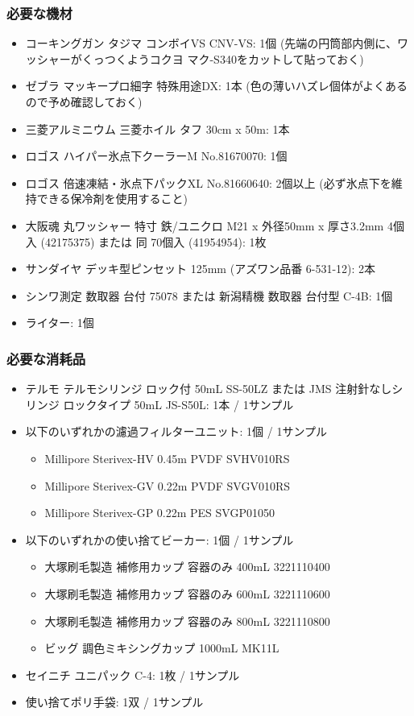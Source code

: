 \documentclass[titlepage,10pt,a4paper]{jsbook}
\begin{document}
\subsubsection{必要な機材}
\begin{itemize}
\item コーキングガン タジマ コンボイVS CNV-VS: 1個 (先端の円筒部内側に、ワッシャーがくっつくようコクヨ マク-S340をカットして貼っておく)
\item ゼブラ マッキープロ細字 特殊用途DX: 1本 (色の薄いハズレ個体がよくあるので予め確認しておく)
\item 三菱アルミニウム 三菱ホイル タフ 30cm x 50m: 1本
\item ロゴス ハイパー氷点下クーラーM No.81670070: 1個
\item ロゴス 倍速凍結・氷点下パックXL No.81660640: 2個以上 (必ず氷点下を維持できる保冷剤を使用すること)
\item 大阪魂 丸ワッシャー 特寸 鉄/ユニクロ M21 x 外径50mm x 厚さ3.2mm 4個入 (42175375) または 同 70個入 (41954954): 1枚
\item サンダイヤ デッキ型ピンセット 125mm (アズワン品番 6-531-12): 2本
\item シンワ測定 数取器 台付 75078 または 新潟精機 数取器 台付型 C-4B: 1個
\item ライター: 1個
\end{itemize}

\subsubsection{必要な消耗品}
\begin{itemize}
\item テルモ テルモシリンジ ロック付 50mL SS-50LZ または JMS 注射針なしシリンジ ロックタイプ 50mL JS-S50L: 1本 / 1サンプル
\item 以下のいずれかの濾過フィルターユニット: 1個 / 1サンプル
\begin{itemize}
\item Millipore Sterivex-HV 0.45{\textmu}m PVDF SVHV010RS
\item Millipore Sterivex-GV 0.22{\textmu}m PVDF SVGV010RS
\item Millipore Sterivex-GP 0.22{\textmu}m PES SVGP01050
\end{itemize}
\item 以下のいずれかの使い捨てビーカー: 1個 / 1サンプル
\begin{itemize}
\item 大塚刷毛製造 補修用カップ 容器のみ 400mL 3221110400
\item 大塚刷毛製造 補修用カップ 容器のみ 600mL 3221110600
\item 大塚刷毛製造 補修用カップ 容器のみ 800mL 3221110800
\item ビッグ 調色ミキシングカップ 1000mL MK11L
\end{itemize}
\item セイニチ ユニパック C-4: 1枚 / 1サンプル
\item 使い捨てポリ手袋: 1双 / 1サンプル
\end{itemize}
\end{document}
